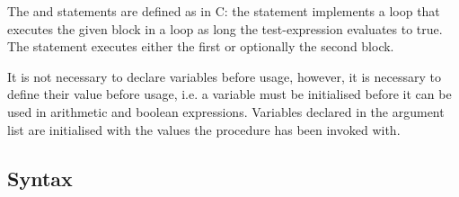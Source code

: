 \documentclass{article}
\begin{document}
The  and  statements are defined as in C: the  statement implements a loop that executes the given block in a loop as long the test-expression evaluates to true. The  statement executes either the first or optionally the second block.

It is not necessary to declare variables before usage, however, it is necessary to define their value before usage, i.e. a variable must be initialised before it can be used in arithmetic and boolean expressions.
Variables declared in the argument list are initialised with the values the procedure has been invoked with.


\subsection{Syntax}
\end{document}
